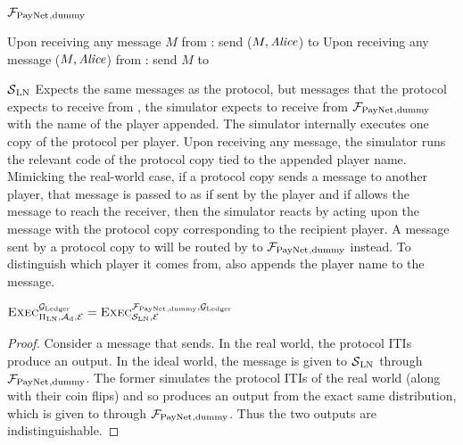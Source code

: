 \begin{systembox}{$\mathcal{F}_{\mathrm{PayNet}}{}_{\mathrm{, dummy}}$}
  \label{alg:fpaynet:dummy}
  \begin{algorithmic}[1]
    \State Upon receiving any message $M$ from \alice: send ($M, \mathit{Alice}$) to
    \simulator
    \State Upon receiving any message ($M, \mathit{Alice}$) from \simulator: send $M$ to
    \alice
  \end{algorithmic}
\end{systembox}

\begin{simulatorbox}{$\mathcal{S}{}_{\mathrm{LN}}$}
  \label{alg:sim:ln}
  Expects the same messages as the protocol, but messages that the protocol
  expects to receive from \environment, the simulator expects to receive from
  $\mathcal{F}_{\mathrm{PayNet}}{}_{\mathrm{, dummy}}$ with the name of the player appended. The
  simulator internally executes one copy of the protocol per player. Upon
  receiving any message, the simulator runs the relevant code of the protocol
  copy tied to the appended player name. Mimicking the real-world case, if a
  protocol copy sends a message to another player, that message is passed to
  \adversary{} as if sent by the player and if \adversary{} allows the message
  to reach the receiver, then the simulator reacts by acting upon the message
  with the protocol copy corresponding to the recipient player. A message sent
  by a protocol copy to \environment{} will be routed by \simulator{} to
  $\mathcal{F}_{\mathrm{PayNet}}{}_{\mathrm{, dummy}}$ instead. To distinguish which player it comes
  from, \simulator{} also appends the player name to the message.
\end{simulatorbox}

\begin{lemma}
  \label{lemma:dummy}
  $\textsc{Exec}^{\mathcal{G}_{\mathrm{Ledger}}}_{\Pi_{\mathrm{LN}}, \mathcal{A}_{\mathrm{d}},
  \mathcal{E}} = \textsc{Exec}^{\mathcal{F}_{\mathrm{PayNet}}{}_{\mathrm{, dummy}},
  \mathcal{G}_{\mathrm{Ledger}}}_{\mathcal{S}_{\mathrm{LN}}, \mathcal{E}}$
\end{lemma}

\begin{proof}
  Consider a message that \environment{} sends. In the real world, the protocol
  ITIs produce an output. In the ideal world, the message is given to
  $\mathcal{S}{}_{\mathrm{LN}}$ through $\mathcal{F}_{\mathrm{PayNet}}{}_{\mathrm{, dummy}}$. The
  former simulates the protocol ITIs of the real world (along with their coin
  flips) and so produces an output from the exact same distribution, which is
  given to \environment{} through $\mathcal{F}_{\mathrm{PayNet}}{}_{\mathrm{, dummy}}$. Thus the two
  outputs are indistinguishable.
\end{proof}

